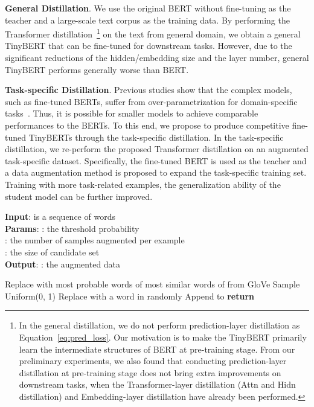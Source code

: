 \documentclass[11pt,a4paper]{article}
\begin{document}
{\bf General Distillation}. We use the original BERT without fine-tuning as the teacher and a large-scale text corpus as the training data. By performing the Transformer distillation~\footnote{In the general distillation, we do not perform prediction-layer distillation as Equation~\ref{eq:pred_loss}. Our  motivation is to make the TinyBERT primarily learn the intermediate structures of BERT at pre-training stage. From our preliminary experiments, we also found that conducting prediction-layer distillation at pre-training stage does not bring extra improvements on downstream tasks, when the Transformer-layer distillation (Attn and Hidn distillation) and Embedding-layer distillation have already been performed.} on the text from general domain, we obtain a general TinyBERT that can be fine-tuned for downstream tasks. However, due to the significant reductions of the hidden/embedding size and the layer number, general TinyBERT performs generally worse than BERT. 

{\bf Task-specific Distillation}. Previous studies show that the complex models, such as fine-tuned BERTs, suffer from over-parametrization for domain-specific tasks~\cite{kovaleva2019revealing}. Thus, it is possible for smaller models to achieve comparable performances to the BERTs. To this end, we propose to  produce competitive fine-tuned TinyBERTs through the task-specific distillation. In the task-specific distillation, we re-perform the proposed Transformer distillation on an augmented task-specific dataset. Specifically, the fine-tuned BERT is used as the teacher and a data augmentation method is proposed to expand the task-specific training set. Training with more task-related examples, the generalization ability of the student model can be further improved.

\begin{algorithm}[tb]
 \small
\caption{Data Augmentation Procedure for Task-specific Distillation}
\label{alg:algorithm}
\textbf{Input}:   is a sequence of words\\
\textbf{Params}:  : the threshold probability\\ 
\hspace*{1.1cm}   : the number of samples augmented per example\\ 
\hspace*{1.1cm}	  : the size of candidate set \\
\textbf{Output}: : the augmented data
\begin{algorithmic}[1] \STATE 
\WHILE{}
\STATE 
{}
     	\STATE Replace  with 
	\STATE  most probable words of 
	\ELSE
		\STATE  most similar words of  from GloVe
	\ENDIF
	\STATE Sample  Uniform(0, 1)
	\IF{}
     		\STATE Replace  with a word in  randomly
	\ENDIF
\ENDFOR
\STATE Append  to 
     	\STATE 
\ENDWHILE
\STATE \textbf{return} 
\end{algorithmic}
\end{algorithm}
\end{document}

